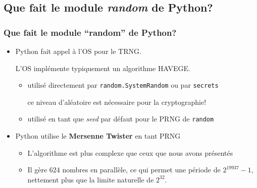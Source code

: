 \documentclass{beamer}
\newcommand\ignore[1]{}
\begin{document}
\subsection{Que fait le module \textit{random} de Python?}
\begin{frame}
  \frametitle{Que fait le module ``random'' de Python?}
  \begin{itemize}
  \item<2-> Python fait appel à l'OS pour le TRNG.\par
    L'OS implémente typiquement un algorithme HAVEGE.
    \medskip
    \begin{itemize}
    \item utilisé directement par \texttt{random.SystemRandom} ou par
      \texttt{secrets}
      \par ce niveau d'aléatoire est nécessaire pour la cryptographie!
      \medskip
    \item utilisé en tant que \textit{seed} par défaut pour le PRNG de \texttt{random}
    \end{itemize}
    \bigskip
  \item<3-> Python utilise le \textbf{Mersenne Twister} en tant PRNG
    \begin{itemize}
    \item L'algorithme est plus complexe que ceux que nous avons présentés
      \medskip
    \item Il gère 624 nombres en parallèle, ce qui permet une période de
      $2^{19937}-1$, nettement plus que la limite naturelle de $2^{32}$.
    \end{itemize}
  \end{itemize}
\end{frame}
\ignore{
\begin{frame}[containsverbatim]{Que fait le module ``random'' de Python?}
  Le module \texttt{random} fournit des fonctions transformant directement ces
  nombres pour émuler des distributions aléatoires usuelles, le tirage sans
  remise, etc.
  \bigskip
  
\begin{lstlisting}
import random

# entier aléatoire entre 0 et 9
n = random.randrange(10)

# flottant aléatoire entre 0 et 10
x = random.uniform(0, 10)

# tirage de 2 éléments au hasard d'une liste
l = random.sample(["a", "b", "c", "d", "e"], 2)
\end{lstlisting}
\end{frame}
}
\end{document}
